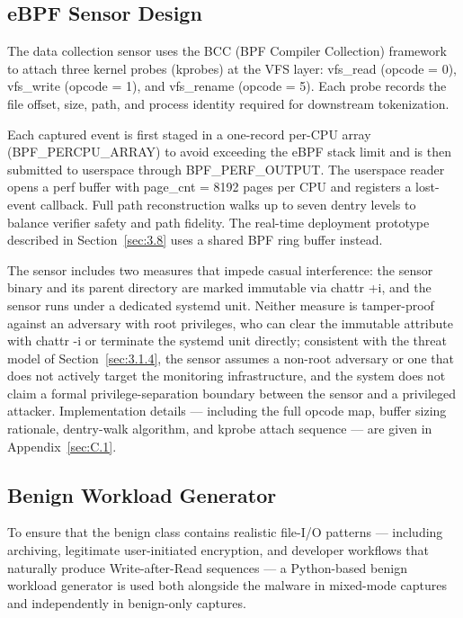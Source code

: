 \subsection{eBPF Sensor Design}\label{sec:3.2.2}

The data collection sensor uses the BCC (BPF Compiler Collection) framework \cite{ref41} to attach three kernel probes (kprobes) at the VFS layer: vfs\_\allowbreak{}read (opcode = 0), vfs\_\allowbreak{}write (opcode = 1), and vfs\_\allowbreak{}rename (opcode = 5). Each probe records the file offset, size, path, and process identity required for downstream tokenization.

Each captured event is first staged in a one-record per-CPU array (BPF\_\allowbreak{}PERCPU\_\allowbreak{}ARRAY) to avoid exceeding the eBPF stack limit and is then submitted to userspace through BPF\_\allowbreak{}PERF\_\allowbreak{}OUTPUT. The userspace reader opens a perf buffer with page\_\allowbreak{}cnt = 8192 pages per CPU and registers a lost-event callback. Full path reconstruction walks up to seven dentry levels to balance verifier safety and path fidelity. The real-time deployment prototype described in Section~\ref{sec:3.8} uses a shared BPF ring buffer instead.

The sensor includes two measures that impede casual interference: the sensor binary and its parent directory are marked immutable via chattr +i, and the sensor runs under a dedicated systemd unit. Neither measure is tamper-proof against an adversary with root privileges, who can clear the immutable attribute with chattr -i or terminate the systemd unit directly; consistent with the threat model of Section~\ref{sec:3.1.4}, the sensor assumes a non-root adversary or one that does not actively target the monitoring infrastructure, and the system does not claim a formal privilege-separation boundary between the sensor and a privileged attacker. Implementation details --- including the full opcode map, buffer sizing rationale, dentry-walk algorithm, and kprobe attach sequence --- are given in Appendix~\ref{sec:C.1}.

\subsection{Benign Workload Generator}\label{sec:3.2.3}

To ensure that the benign class contains realistic file-I/\allowbreak{}O patterns --- including archiving, legitimate user-initiated encryption, and developer workflows that naturally produce Write-after-Read sequences --- a Python-based benign workload generator is used both alongside the malware in mixed-mode captures and independently in benign-only captures.

